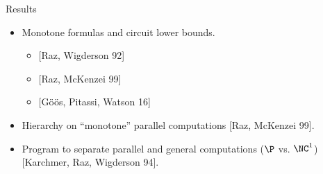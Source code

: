 \begin{frame}{Results}

    \begin{itemize}
        \item Monotone formulas and circuit lower bounds.
            \begin{itemize}
                \item{} [Raz, Wigderson 92]
                \item{} [Raz, McKenzei 99]
                \item{} [G{\"{o}}{\"{o}}s, Pitassi, Watson 16]
            \end{itemize}
        \item Hierarchy on ``monotone'' parallel computations [Raz, McKenzei 99].
        \item Program to separate parallel and general computations ($\P$ vs. $\NC^1$) [Karchmer, Raz,
            Wigderson 94].
    \end{itemize}
\end{frame}